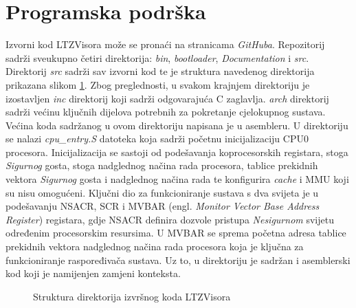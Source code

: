 \documentclass[times, utf8, diplomski, numeric]{fer}
\begin{document}
\section{Programska podrška}
Izvorni kod LTZVisora može se pronaći na stranicama \textit{GitHuba}. Repozitorij sadrži sveukupno četiri direktorija:
\textit{bin}, \textit{bootloader}, \textit{Documentation} i \textit{src}. Direktorij \textit{src} sadrži sav izvorni kod te
je struktura navedenog direktorija prikazana slikom \ref{srcdir}. Zbog preglednosti, u svakom krajnjem direktoriju je
izostavljen \textit{inc} direktorij koji sadrži odgovarajuća C zaglavlja.
\textit{arch} direktorij sadrži većinu ključnih dijelova potrebnih za pokretanje cjelokupnog sustava. Većina koda sadržanog u
ovom direktoriju napisana je u asembleru. U direktoriju se nalazi \textit{cpu\_entry.S} datoteka koja sadrži početnu
inicijalizaciju CPU0 procesora. Inicijalizacija se sastoji od podešavanja koprocesorskih registara, stoga \textit{Sigurnog} gosta,
stoga nadglednog načina rada procesora, tablice prekidnih vektora \textit{Sigurnog} gosta i nadglednog načina rada te konfigurira
\textit{cache} i MMU koji su nisu omogućeni. Ključni dio za funkcioniranje sustava s dva svijeta je u podešavanju NSACR, SCR
i MVBAR (engl. \textit{Monitor Vector Base Address Register}) registara, gdje NSACR definira dozvole pristupa \textit{Nesigurnom} svijetu
određenim procesorskim resursima. U MVBAR se sprema početna adresa tablice prekidnih vektora nadglednog načina rada procesora
koja je ključna za funkcioniranje raspoređivača sustava. Uz to, u direktoriju je sadržan i asemblerski kod koji je namijenjen
zamjeni konteksta.

\begin{figure}[H]
  \centering
  \caption{Struktura direktorija izvršnog koda LTZVisora}
  \label{srcdir}
\end{figure}
\end{document}
